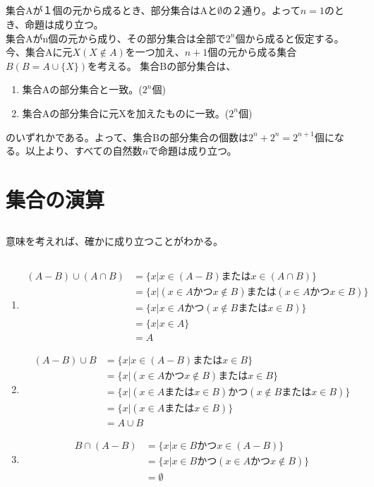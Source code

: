 \documentclass{jsarticle}
\begin{document}
\subsection{}
集合Aが１個の元から成るとき、部分集合はAと$\emptyset$の２通り。よって$n=1$のとき、命題は成り立つ。\\
集合Aがn個の元から成り、その部分集合は全部で$2^n$個から成ると仮定する。
今、集合Aに元$X(X\notin A)$を一つ加え、$n+1$個の元から成る集合$B(B=A\cup\{X\})$を考える。
集合Bの部分集合は、
\begin{enumerate}
\item 集合Aの部分集合と一致。($2^n$個)
\item 集合Aの部分集合に元Xを加えたものに一致。($2^n$個)
\end{enumerate}
のいずれかである。よって、集合Bの部分集合の個数は$2^n+2^n=2^{n+1}$個になる。以上より、すべての自然数$n$で命題は成り立つ。

\section{集合の演算}
\subsection{}
意味を考えれば、確かに成り立つことがわかる。

\subsection{}
\begin{enumerate}
\item
\begin{align*}
(A-B)\cup(A\cap B)&=\{x|x\in(A-B) またはx\in(A\cap B)\}\\
&=\{x|(x\in A かつ x\notin B) または (x\in A かつ x\in B)\}\\
&=\{x|x\in A かつ (x\notin B または x\in B)\}\\
&=\{x|x\in A\}\\
&=A
\end{align*}


\item
\begin{align*}
(A-B)\cup B &=\{x| x\in (A-B) または x \in B\}\\
&=\{ x | (x \in A かつ x\notin B)　または x\in B \}\\
&=\{x | (x\in Aまたは x\in B) かつ( x\notin B または x\in B)\}\\
&=\{x| (x\in Aまたは x\in B)\}\\
&=A\cup B
\end{align*}


\item
\begin{align*}
B\cap(A-B)&=\{x|x\in B かつ x \in(A-B)\}\\
&=\{x|x\in B かつ( x \in A かつ x\notin B)\}\\
&=\emptyset
\end{align*}
\end{enumerate}
\end{document}
